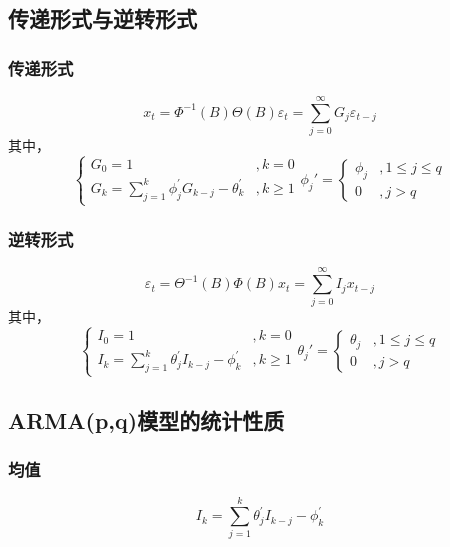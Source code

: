 \documentclass[12pt, a4paper, oneside]{ctexbook}
\begin{document}
\subsection{传递形式与逆转形式}
\subsubsection{传递形式}
\begin{equation}
    x_t=\Phi^{-1}(B)\Theta(B)\varepsilon_t=\sum_{j=0}^\infty G_j\varepsilon_{t-j}
\end{equation}
其中，
\begin{equation*}
    \begin{cases}
        G_0=1                                                    & ,k=0      \\
        G_k=\sum_{j=1}^k\phi_j^{\prime}G_{k-j}-\theta_k^{\prime} & ,  k\geq1
    \end{cases}
    \phi_j'=\begin{cases}
        \phi_j & ,1\leq j\leq q \\
        0      & ,j>q
    \end{cases}
\end{equation*}

\subsubsection{逆转形式}
\begin{equation}
    \varepsilon_t=\Theta^{-1}(B)\Phi(B)x_t=\sum_{j=0}^\infty I_jx_{t-j}
\end{equation}
其中，
\begin{equation*}
    \begin{cases}
        I_0=1                                                    & ,k=0      \\
        I_k=\sum_{j=1}^k\theta_j^{\prime}I_{k-j}-\phi_k^{\prime} & ,  k\geq1
    \end{cases}
    \theta_j'=\begin{cases}
        \theta_j & ,1\leq j\leq q \\
        0        & ,j>q
    \end{cases}
\end{equation*}

\subsection{ARMA(p,q)模型的统计性质}
\subsubsection{均值}
\begin{equation}
    I_k=\sum_{j=1}^k\theta_j^{\prime}I_{k-j}-\phi_k^{\prime}
\end{equation}
\end{document}
